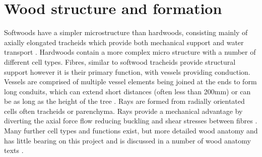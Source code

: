 \section{Wood structure and formation}
Softwoods have a simpler microstructure than hardwoods, consisting mainly of
axially elongated tracheids which provide both mechanical support and water
transport \cite{bowyer2007forest}. Hardwoods contain a more complex micro structure with a number
of different cell types. Fibres, similar to softwood tracheids provide
structural support however it is their primary function, with vessels providing
conduction. Vessels are comprised of
multiple vessel elements being joined at the ends to form long conduits, which
can extend short distances (often less than 200mm) or can be as long as the
height of the tree \cite{walker1993primary}. Rays are formed from radially orientated cells often tracheids or parenchyma. Rays provide a mechanical advantage by diverting the axial force flow reducing buckling and shear stresses between fibres \cite{mattheck1997wood}. Many further cell types and functions exist, but more detailed wood anatomy and
has little bearing on this project and is discussed in a number of wood anatomy
texts \cite{fromm2013cellular}.